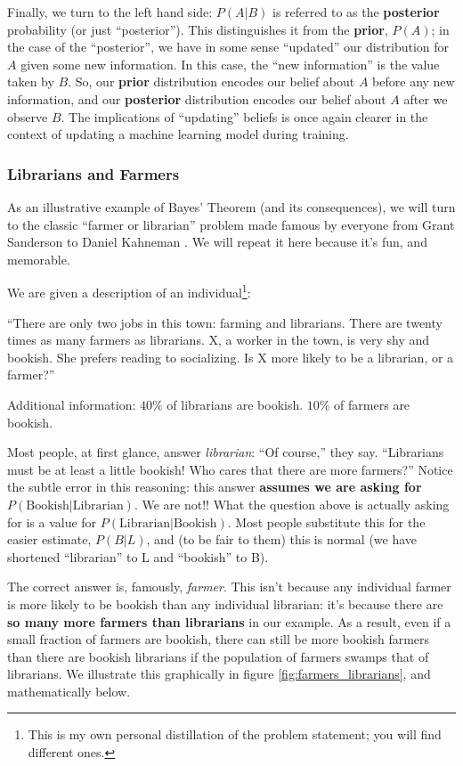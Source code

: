 \documentclass[]{article}
\begin{document}
Finally, we turn to the left hand side: $P(A|B)$ is referred to as the \textbf{posterior} probability (or just ``posterior''). This distinguishes it from the \textbf{prior}, $P(A)$; in the case of the ``posterior'', we have in some sense ``updated'' our distribution for $A$ given some new information. In this case, the ``new information'' is the value taken by $B$. So, our \textbf{prior} distribution encodes our belief about $A$ before any new information, and our \textbf{posterior} distribution encodes our belief about $A$ after we observe $B$. The implications of ``updating'' beliefs is once again clearer in the context of updating a machine learning model during training.

\subsubsection{Librarians and Farmers}

As an illustrative example of Bayes' Theorem (and its consequences), we will turn to the classic ``farmer or librarian'' problem made famous by everyone from Grant Sanderson \cite{SandersonBayes2016} to Daniel Kahneman \cite{kahneman2011thinking}. We will repeat it here because it's fun, and memorable.

We are given a description of an individual\footnote{This is my own personal distillation of the problem statement; you will find different ones.}:

``There are only two jobs in this town: farming and librarians. There are twenty times as many farmers as librarians. X, a worker in the town, is very shy and bookish. She prefers reading to socializing. Is X more likely to be a librarian, or a farmer?''

Additional information: $40\%$ of librarians are bookish. $10\%$ of farmers are bookish.

Most people, at first glance, answer \textit{librarian}: ``Of course,'' they say. ``Librarians must be at least a little bookish! Who cares that there are more farmers?'' Notice the subtle error in this reasoning: this answer \textbf{assumes we are asking for} $P(\text{Bookish}|\text{Librarian})$. We are not!! What the question above is actually asking for is a value for $P(\text{Librarian}|\text{Bookish})$. Most people substitute this for the easier estimate, $P(B|L)$, and (to be fair to them) this is normal (we have shortened ``librarian'' to L and ``bookish'' to B).

The correct answer is, famously, \textit{farmer}. This isn't because any individual farmer is more likely to be bookish than any individual librarian: it's because there are \textbf{so many more farmers than librarians} in our example. As a result, even if a small fraction of farmers are bookish, there can still be more bookish farmers than there are bookish librarians if the population of farmers swamps that of librarians. We illustrate this graphically in figure \ref{fig:farmers_librarians}, and mathematically below.
\end{document}
